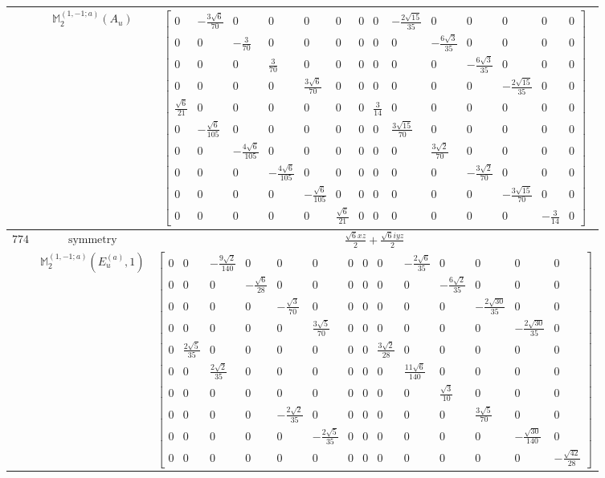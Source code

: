 \documentclass[fleqn,8pt,landscape]{jsarticle}
\begin{document}
\begin{longtable}{ccc}
$  $ & $ \mathbb{M}_{2}^{(1,-1;a)}(A_{u}) $ & $ \begin{bmatrix} 0 & - \frac{3 \sqrt{6}}{70} & 0 & 0 & 0 & 0 & 0 & 0 & - \frac{2 \sqrt{15}}{35} & 0 & 0 & 0 & 0 & 0 \\ 0 & 0 & - \frac{3}{70} & 0 & 0 & 0 & 0 & 0 & 0 & - \frac{6 \sqrt{3}}{35} & 0 & 0 & 0 & 0 \\ 0 & 0 & 0 & \frac{3}{70} & 0 & 0 & 0 & 0 & 0 & 0 & - \frac{6 \sqrt{3}}{35} & 0 & 0 & 0 \\ 0 & 0 & 0 & 0 & \frac{3 \sqrt{6}}{70} & 0 & 0 & 0 & 0 & 0 & 0 & - \frac{2 \sqrt{15}}{35} & 0 & 0 \\ \frac{\sqrt{6}}{21} & 0 & 0 & 0 & 0 & 0 & 0 & \frac{3}{14} & 0 & 0 & 0 & 0 & 0 & 0 \\ 0 & - \frac{\sqrt{6}}{105} & 0 & 0 & 0 & 0 & 0 & 0 & \frac{3 \sqrt{15}}{70} & 0 & 0 & 0 & 0 & 0 \\ 0 & 0 & - \frac{4 \sqrt{6}}{105} & 0 & 0 & 0 & 0 & 0 & 0 & \frac{3 \sqrt{2}}{70} & 0 & 0 & 0 & 0 \\ 0 & 0 & 0 & - \frac{4 \sqrt{6}}{105} & 0 & 0 & 0 & 0 & 0 & 0 & - \frac{3 \sqrt{2}}{70} & 0 & 0 & 0 \\ 0 & 0 & 0 & 0 & - \frac{\sqrt{6}}{105} & 0 & 0 & 0 & 0 & 0 & 0 & - \frac{3 \sqrt{15}}{70} & 0 & 0 \\ 0 & 0 & 0 & 0 & 0 & \frac{\sqrt{6}}{21} & 0 & 0 & 0 & 0 & 0 & 0 & - \frac{3}{14} & 0 \end{bmatrix} $ \\ \hline
$ 774 $ & $ \text{symmetry} $ & $ \frac{\sqrt{6} x z}{2} + \frac{\sqrt{6} i y z}{2} $ \\
$  $ & $ \mathbb{M}_{2}^{(1,-1;a)}(E_{u}^{(a)},1) $ & $ \begin{bmatrix} 0 & 0 & - \frac{9 \sqrt{2}}{140} & 0 & 0 & 0 & 0 & 0 & 0 & - \frac{2 \sqrt{6}}{35} & 0 & 0 & 0 & 0 \\ 0 & 0 & 0 & - \frac{\sqrt{6}}{28} & 0 & 0 & 0 & 0 & 0 & 0 & - \frac{6 \sqrt{2}}{35} & 0 & 0 & 0 \\ 0 & 0 & 0 & 0 & - \frac{\sqrt{3}}{70} & 0 & 0 & 0 & 0 & 0 & 0 & - \frac{2 \sqrt{30}}{35} & 0 & 0 \\ 0 & 0 & 0 & 0 & 0 & \frac{3 \sqrt{5}}{70} & 0 & 0 & 0 & 0 & 0 & 0 & - \frac{2 \sqrt{30}}{35} & 0 \\ 0 & \frac{2 \sqrt{5}}{35} & 0 & 0 & 0 & 0 & 0 & 0 & \frac{3 \sqrt{2}}{28} & 0 & 0 & 0 & 0 & 0 \\ 0 & 0 & \frac{2 \sqrt{2}}{35} & 0 & 0 & 0 & 0 & 0 & 0 & \frac{11 \sqrt{6}}{140} & 0 & 0 & 0 & 0 \\ 0 & 0 & 0 & 0 & 0 & 0 & 0 & 0 & 0 & 0 & \frac{\sqrt{3}}{10} & 0 & 0 & 0 \\ 0 & 0 & 0 & 0 & - \frac{2 \sqrt{2}}{35} & 0 & 0 & 0 & 0 & 0 & 0 & \frac{3 \sqrt{5}}{70} & 0 & 0 \\ 0 & 0 & 0 & 0 & 0 & - \frac{2 \sqrt{5}}{35} & 0 & 0 & 0 & 0 & 0 & 0 & - \frac{\sqrt{30}}{140} & 0 \\ 0 & 0 & 0 & 0 & 0 & 0 & 0 & 0 & 0 & 0 & 0 & 0 & 0 & - \frac{\sqrt{42}}{28} \end{bmatrix} $ \\ \hline

\end{longtable}
\end{document}

